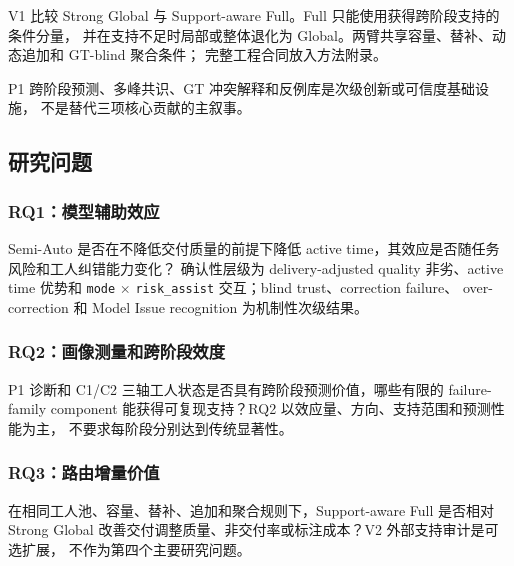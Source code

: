 V1 比较 Strong Global 与 Support-aware Full。Full 只能使用获得跨阶段支持的条件分量，
并在支持不足时局部或整体退化为 Global。两臂共享容量、替补、动态追加和 GT-blind 聚合条件；
完整工程合同放入方法附录。

P1 跨阶段预测、多峰共识、GT 冲突解释和反例库是次级创新或可信度基础设施，
不是替代三项核心贡献的主叙事。

\subsection{研究问题}

\subsubsection{RQ1：模型辅助效应}

Semi-Auto 是否在不降低交付质量的前提下降低 active time，其效应是否随任务风险和工人纠错能力变化？
确认性层级为 delivery-adjusted quality 非劣、active time 优势和
\texttt{mode} $\times$ \texttt{risk\_assist} 交互；blind trust、correction failure、
over-correction 和 Model Issue recognition 为机制性次级结果。

\subsubsection{RQ2：画像测量和跨阶段效度}

P1 诊断和 C1/C2 三轴工人状态是否具有跨阶段预测价值，哪些有限的 failure-family
component 能获得可复现支持？RQ2 以效应量、方向、支持范围和预测性能为主，
不要求每阶段分别达到传统显著性。

\subsubsection{RQ3：路由增量价值}

在相同工人池、容量、替补、追加和聚合规则下，Support-aware Full 是否相对
Strong Global 改善交付调整质量、非交付率或标注成本？V2 外部支持审计是可选扩展，
不作为第四个主要研究问题。
